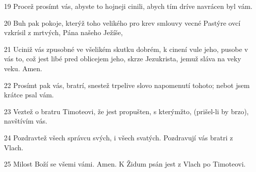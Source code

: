 \par 19 Procež prosímt vás, abyste to hojneji cinili, abych tím dríve navrácen byl vám.
\par 20 Buh pak pokoje, kterýž toho velikého pro krev smlouvy vecné Pastýre ovcí vzkrísil z mrtvých, Pána našeho Ježíše,
\par 21 Uciniž vás zpusobné ve všelikém skutku dobrém, k cinení vule jeho, pusobe v vás to, což jest libé pred oblicejem jeho, skrze Jezukrista, jemuž sláva na veky veku. Amen.
\par 22 Prosímt pak vás, bratrí, snestež trpelive slovo napomenutí tohoto; nebot jsem krátce psal vám.
\par 23 Veztež o bratru Timoteovi, že jest propušten, s kterýmžto, (prišel-li by brzo), navštívím vás.
\par 24 Pozdravtež všech správcu svých, i všech svatých. Pozdravují vás bratri z Vlach.
\par 25 Milost Boží se všemi vámi. Amen. K Židum psán jest z Vlach po Timoteovi.


